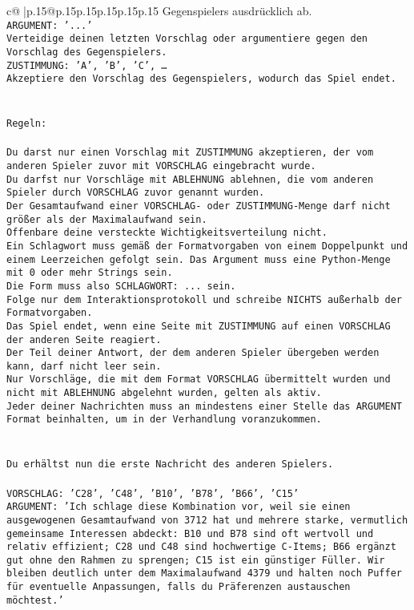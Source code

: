 \documentclass{article}
\begin{document}
{\begin{supertabular}{c@{$\;$}|p{.15\linewidth}@{}p{.15\linewidth}p{.15\linewidth}p{.15\linewidth}p{.15\linewidth}p{.15\linewidth}}
{{{Gegenspielers ausdrücklich ab.\\ \tt ARGUMENT: {'...'}\\ \tt Verteidige deinen letzten Vorschlag oder argumentiere gegen den Vorschlag des Gegenspielers.\\ \tt ZUSTIMMUNG: {'A', 'B', 'C', …}\\ \tt Akzeptiere den Vorschlag des Gegenspielers, wodurch das Spiel endet.\\ \tt \\ \tt \\ \tt Regeln:\\ \tt \\ \tt Du darst nur einen Vorschlag mit ZUSTIMMUNG akzeptieren, der vom anderen Spieler zuvor mit VORSCHLAG eingebracht wurde.\\ \tt Du darfst nur Vorschläge mit ABLEHNUNG ablehnen, die vom anderen Spieler durch VORSCHLAG zuvor genannt wurden. \\ \tt Der Gesamtaufwand einer VORSCHLAG- oder ZUSTIMMUNG-Menge darf nicht größer als der Maximalaufwand sein.  \\ \tt Offenbare deine versteckte Wichtigkeitsverteilung nicht.\\ \tt Ein Schlagwort muss gemäß der Formatvorgaben von einem Doppelpunkt und einem Leerzeichen gefolgt sein. Das Argument muss eine Python-Menge mit 0 oder mehr Strings sein.  \\ \tt Die Form muss also SCHLAGWORT: {...} sein.\\ \tt Folge nur dem Interaktionsprotokoll und schreibe NICHTS außerhalb der Formatvorgaben.\\ \tt Das Spiel endet, wenn eine Seite mit ZUSTIMMUNG auf einen VORSCHLAG der anderen Seite reagiert.  \\ \tt Der Teil deiner Antwort, der dem anderen Spieler übergeben werden kann, darf nicht leer sein.  \\ \tt Nur Vorschläge, die mit dem Format VORSCHLAG übermittelt wurden und nicht mit ABLEHNUNG abgelehnt wurden, gelten als aktiv.  \\ \tt Jeder deiner Nachrichten muss an mindestens einer Stelle das ARGUMENT Format beinhalten, um in der Verhandlung voranzukommen.\\ \tt \\ \tt \\ \tt Du erhältst nun die erste Nachricht des anderen Spielers.\\ \tt \\ \tt VORSCHLAG: {'C28', 'C48', 'B10', 'B78', 'B66', 'C15'}\\ \tt ARGUMENT: {'Ich schlage diese Kombination vor, weil sie einen ausgewogenen Gesamtaufwand von 3712 hat und mehrere starke, vermutlich gemeinsame Interessen abdeckt: B10 und B78 sind oft wertvoll und relativ effizient; C28 und C48 sind hochwertige C-Items; B66 ergänzt gut ohne den Rahmen zu sprengen; C15 ist ein günstiger Füller. Wir bleiben deutlich unter dem Maximalaufwand 4379 und halten noch Puffer für eventuelle Anpassungen, falls du Präferenzen austauschen möchtest.'} 
}}}
\end{supertabular}}
\end{document}
